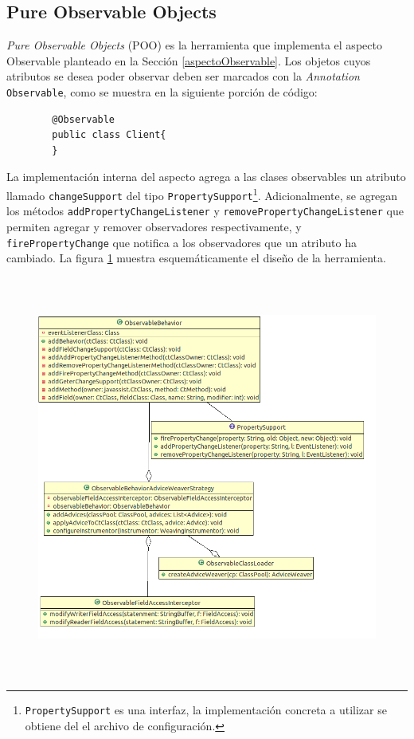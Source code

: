 \subsection{Pure Observable Objects}
	\label{poo}
	\emph{Pure Observable Objects} (POO) es la herramienta que implementa el
	aspecto Observable planteado en la Sección \ref{aspectoObservable}.
	Los objetos cuyos atributos se desea poder observar deben ser marcados con
	la \emph{Annotation} \lstinline|Observable|, como
	se muestra en la siguiente porción de código:
	
	\begin{lstlisting} 
		@Observable
		public class Client{
		}
	\end{lstlisting}
	
	La implementación interna del aspecto agrega a las clases observables un
	atributo llamado \lstinline|changeSupport| del tipo
	\lstinline|PropertySupport|\footnote{\lstinline|PropertySupport| es una
	interfaz, la implementación concreta a utilizar se obtiene del el archivo de
	configuración.}.
	Adicionalmente, se agregan los métodos 
	\lstinline|addPropertyChangeListener| y
	\lstinline|removePropertyChangeListener| que permiten agregar 
	y remover observadores respectivamente, y \lstinline|firePropertyChange|
	que notifica a los observadores que un atributo ha cambiado.
	La figura \ref{fig:poo} muestra
	esquemáticamente el diseño de la herramienta.
	
	\begin{figure}[h]
		\includegraphics[width=500px, height=500px]{img/poo}
	 	\label{fig:poo}
	 	\caption{}
	\end{figure}
	